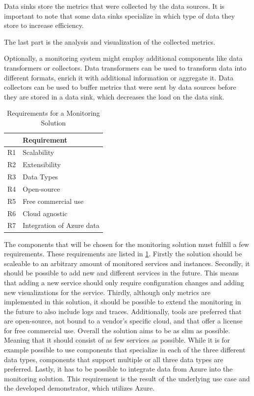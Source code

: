 Data sinks store the metrics that were collected by the data sources.
It is important to note that some data sinks specialize in which type of data they store
to increase efficiency.

The last part is the analysis and visualization of the collected metrics.

Optionally, a monitoring system might employ additional components like data transformers or collectors.
Data transformers can be used to transform data into different formats, enrich it with additional information
or aggregate it.
Data collectors can be used to buffer metrics that were sent by data sources before they are stored in a data sink,
which decreases the load on the data sink.

\begin{table}[]
\begin{tabular}{l|l}
	& Requirement       			\\
\hline
R1 	& Scalability 					\\
R2 	& Extensibility       			\\
R3 	& Data Types 					\\
R4 	& Open-source       			\\
R5 	& Free commercial use  			\\
R6 	& Cloud agnostic       			\\
R7 	& Integration of Azure data
\end{tabular}
\caption{Requirements for a Monitoring Solution}
\label{tab:requirements}
\end{table}

The components that will be chosen for the monitoring solution must fulfill a few requirements.
These requirements are listed in \ref{tab:requirements}.
Firstly the solution should be scaleable to an arbitrary amount of monitored services and instances.
Secondly, it should be possible to add new and different services in the future.
This means that adding a new service should only require configuration changes and adding new visualizations for the service.
Thirdly, although only metrics are implemented in this solution, it should be possible to extend
the monitoring in the future to also include logs and traces.
Additionally, tools are preferred that are open-source, not bound to a vendor's specific cloud,
and that offer a license for free commercial use.
Overall the solution aims to be as slim as possible. Meaning that it should consist of as few services as possible.
While it is for example possible to use components that specialize in each of the three different data types,
components that support multiple or all three data types are preferred.
Lastly, it has to be possible to integrate data from Azure into the monitoring solution.
This requirement is the result of the underlying use case and the developed demonstrator,
which utilizes Azure.

